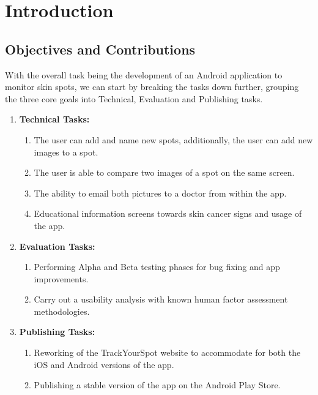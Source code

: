 \chapter{Introduction}

\section{Objectives and Contributions}
With the overall task being the development of an Android application to monitor skin spots, we can start by breaking the tasks down further, grouping the three core goals into Technical, Evaluation and Publishing tasks.
\begin{enumerate}
    \item \textbf{Technical Tasks:}
    \begin{enumerate}
        \item The user can add and name new spots, additionally, the user can add new images to a spot.
        \item The user is able to compare two images of a spot on the same screen.
        \item The ability to email both pictures to a doctor from within the app.
        \item Educational information screens towards skin cancer signs and usage of the app.
    \end{enumerate}
    \item \textbf{Evaluation Tasks:}
    \begin{enumerate}
        \item Performing Alpha and Beta testing phases for bug fixing and app improvements.
        \item Carry out a usability analysis with known human factor assessment methodologies.
    \end{enumerate}
    \item \textbf{Publishing Tasks:}
    \begin{enumerate}
        \item Reworking of the TrackYourSpot website to accommodate for both the iOS and Android versions of the app.
        \item Publishing a stable version of the app on the Android Play Store.
    \end{enumerate}
\end{enumerate}

